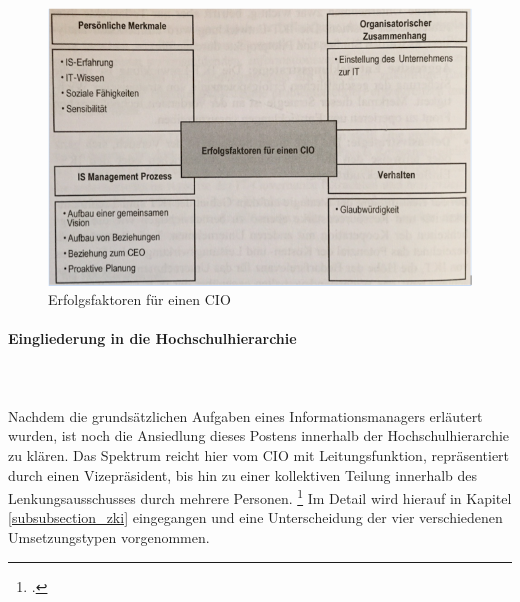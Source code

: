 \begin{figure}[h!]
	\centering
	\includegraphics[width=15cm]{kapitel/gruppe1_2/bilder/erfolgsfaktoren_cio} 
	\caption{Erfolgsfaktoren für einen CIO\protect\footnotemark}
	\label{efec}
\end{figure}

\paragraph{Eingliederung in die Hochschulhierarchie}\mbox{}\\\\
Nachdem die grundsätzlichen Aufgaben eines Informationsmanagers erläutert wurden, ist noch die Ansiedlung dieses Postens innerhalb der Hochschulhierarchie zu klären. Das Spektrum reicht hier vom CIO mit Leitungsfunktion, repräsentiert durch einen Vizepräsident, bis hin zu einer kollektiven Teilung innerhalb des Lenkungsausschusses durch mehrere Personen. \footcite[Vgl.][10]{leitner_itil_2008} Im Detail wird hierauf in Kapitel \ref{subsubsection_zki} eingegangen und eine Unterscheidung der vier verschiedenen Umsetzungstypen vorgenommen.

